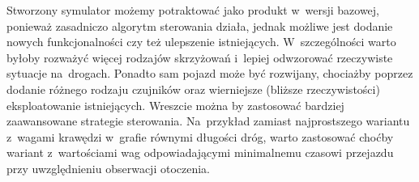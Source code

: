 \documentclass[11pt, a4paper, twoside]{article}
\begin{document}
Stworzony symulator możemy potraktować jako produkt w~wersji bazowej, ponieważ zasadniczo algorytm sterowania działa, jednak możliwe jest dodanie nowych funkcjonalności czy też ulepszenie istniejących. W~szczególności warto byłoby rozważyć więcej rodzajów skrzyżowań i~lepiej odwzorować rzeczywiste sytuacje na~drogach. Ponadto sam pojazd może być rozwijany, chociażby poprzez dodanie różnego rodzaju czujników oraz wierniejsze (bliższe rzeczywistości) eksploatowanie istniejących. Wreszcie można by zastosować bardziej zaawansowane strategie sterowania. Na~przykład zamiast najprostszego wariantu z~wagami krawędzi w~grafie równymi długości dróg, warto zastosować choćby wariant z~wartościami wag odpowiadającymi minimalnemu czasowi przejazdu przy uwzględnieniu obserwacji otoczenia. 
		
		
\end{document}
